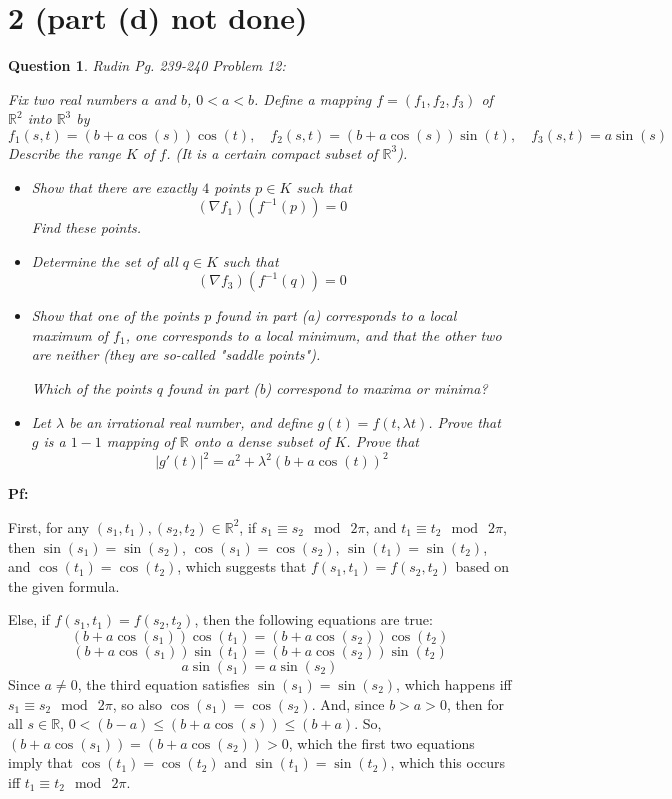 \documentclass{article}
\newtheorem{question}{Question}
\begin{document}
\section*{2 (part (d) not done)}
\begin{myBox}[]{}
    \begin{question}
        Rudin Pg. 239-240 Problem 12:

        Fix two real numbers $a$ and $b$, $0<a<b$. Define a mapping $f=(f_1,f_2,f_3)$ of $\mathbb{R}^2$ into $\mathbb{R}^3$ by 
        $$f_1(s,t)=(b+a\cos(s))\cos(t),\quad f_2(s,t)=(b+a\cos(s))\sin(t),\quad f_3(s,t)=a\sin(s)$$
        Describe the range $K$ of $f$. (It is a certain compact subset of $\mathbb{R}^3$).

        \begin{itemize}
            \item[(a)] Show that there are exactly $4$ points $p\in K$ such that 
            $$(\nabla f_1)(f^{-1}(p))=0$$
            Find these points.
            \item[(b)] Determine the set of all $q\in K$ such that 
            $$(\nabla f_3)(f^{-1}(q))=0$$
            \item[(c)] Show that one of the points $p$ found in part (a) corresponds to a local maximum of $f_1$, one corresponds to a local minimum, and that the other two are neither (they are so-called "saddle points").
            
            Which of the points $q$ found in part (b) correspond to maxima or minima?
            \item[(d)] Let $\lambda$ be an irrational real number, and define $g(t)=f(t,\lambda t)$. Prove that $g$ is a $1-1$ mapping of $\mathbb{R}$ onto a dense subset of $K$. Prove that
            $$|g'(t)|^2 = a^2+\lambda^2(b+a\cos(t))^2$$
        \end{itemize}
    \end{question}
\end{myBox}

\textbf{Pf:}

First, for any $(s_1,t_1), (s_2,t_2)\in\mathbb{R}^2$, if $s_1\equiv s_2\mod\ 2\pi$, and $t_1\equiv t_2\mod\ 2\pi$, then $\sin(s_1)=\sin(s_2)$, $\cos(s_1)=\cos(s_2)$, $\sin(t_1)=\sin(t_2)$, and $\cos(t_1)=\cos(t_2)$,
which suggests that $f(s_1,t_1)=f(s_2,t_2)$ based on the given formula.

Else, if $f(s_1,t_1)=f(s_2,t_2)$, then the following equations are true:
$$(b+a\cos(s_1))\cos(t_1)=(b+a\cos(s_2))\cos(t_2)$$
$$(b+a\cos(s_1))\sin(t_1)=(b+a\cos(s_2))\sin(t_2)$$
$$a\sin(s_1)=a\sin(s_2)$$
Since $a\neq 0$, the third equation satisfies $\sin(s_1)=\sin(s_2)$, which happens iff $s_1\equiv s_2\mod\ 2\pi$, so also $\cos(s_1)=\cos(s_2)$.
And, since $b>a>0$, then for all $s\in\mathbb{R}$, $0<(b-a)\leq(b+a\cos(s))\leq (b+a)$. So, $(b+a\cos(s_1))=(b+a\cos(s_2))>0$,
which the first two equations imply that $\cos(t_1)=\cos(t_2)$ and $\sin(t_1)=\sin(t_2)$, which this occurs iff $t_1 \equiv t_2\mod\ 2\pi$.
\end{document}
